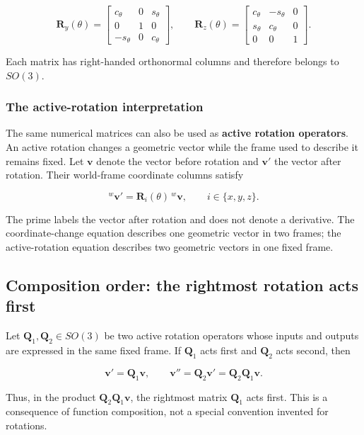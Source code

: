 \documentclass[
  australian,
  12pt,
  letterpaper,
  DIV=11,
  numbers=noendperiod,
  twoside]{scrreprt}
\begin{document}
\[
\boxed{
\mathbf R_y(\theta)
=
\begin{bmatrix}
c_\theta&0&s_\theta\\
0&1&0\\
-s_\theta&0&c_\theta
\end{bmatrix},
\qquad
\mathbf R_z(\theta)
=
\begin{bmatrix}
c_\theta&-s_\theta&0\\
s_\theta&c_\theta&0\\
0&0&1
\end{bmatrix}
}.
\]

Each matrix has right-handed orthonormal columns and therefore belongs
to \(SO(3)\).

\subsubsection{The active-rotation
interpretation}\label{the-active-rotation-interpretation}

The same numerical matrices can also be used as \textbf{active rotation
operators}. An active rotation changes a geometric vector while the
frame used to describe it remains fixed. Let \(\mathbf v\) denote the
vector before rotation and \(\mathbf v'\) the vector after rotation.
Their world-frame coordinate columns satisfy

\[
\boxed{
{}^{w}\mathbf v'
=
\mathbf R_i(\theta)\,{}^{w}\mathbf v,
\qquad
i\in\{x,y,z\}
}.
\]

The prime labels the vector after rotation and does not denote a
derivative. The coordinate-change equation describes one geometric
vector in two frames; the active-rotation equation describes two
geometric vectors in one fixed frame.

\subsection{Composition order: the rightmost rotation acts
first}\label{sec-so3-composition-order}

Let \(\mathbf Q_1,\mathbf Q_2\in SO(3)\) be two active rotation
operators whose inputs and outputs are expressed in the same fixed
frame. If \(\mathbf Q_1\) acts first and \(\mathbf Q_2\) acts second,
then

\[
\mathbf v'
=
\mathbf Q_1\mathbf v,
\qquad
\mathbf v''
=
\mathbf Q_2\mathbf v'
=
\mathbf Q_2\mathbf Q_1\mathbf v.
\]

Thus, in the product \(\mathbf Q_2\mathbf Q_1\mathbf v\), the rightmost
matrix \(\mathbf Q_1\) acts first. This is a consequence of function
composition, not a special convention invented for rotations.
\end{document}
